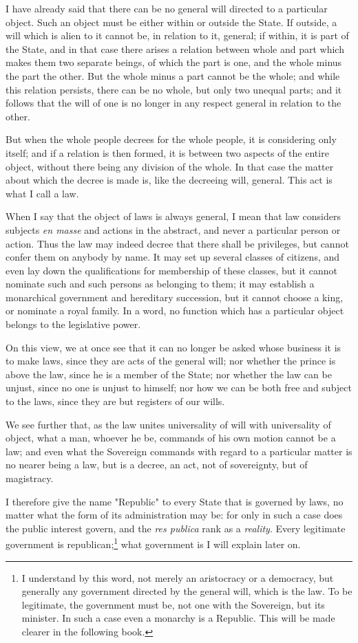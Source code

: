 \documentclass[12pt]{book}
\begin{document}
I have already said that there can be no general will directed to a particular object. Such an object must be either within or outside the State. If outside, a will which is alien to it cannot be, in relation to it, general; if within, it is part of the State, and in that case there arises a relation between whole and part which makes them two separate beings, of which the part is one, and the whole minus the part the other. But the whole minus a part cannot be the whole; and while this relation persists, there can be no whole, but only two unequal parts; and it follows that the will of one is no longer in any respect general in relation to the other.

But when the whole people decrees for the whole people, it is considering only itself; and if a relation is then formed, it is between two aspects of the entire object, without there being any division of the whole. In that case the matter about which the decree is made is, like the decreeing will, general. This act is what I call a law.

When I say that the object of laws is always general, I mean that law considers subjects \textit{en masse} and actions in the abstract, and never a particular person or action. Thus the law may indeed decree that there shall be privileges, but cannot confer them on anybody by name. It may set up several classes of citizens, and even lay down the qualifications for membership of these classes, but it cannot nominate such and such persons as belonging to them; it may establish a monarchical government and hereditary succession, but it cannot choose a king, or nominate a royal family. In a word, no function which has a particular object belongs to the legislative power.

On this view, we at once see that it can no longer be asked whose business it is to make laws, since they are acts of the general will; nor whether the prince is above the law, since he is a member of the State; nor whether the law can be unjust, since no one is unjust to himself; nor how we can be both free and subject to the laws, since they are but registers of our wills.

We see further that, as the law unites universality of will with universality of object, what a man, whoever he be, commands of his own motion cannot be a law; and even what the Sovereign commands with regard to a particular matter is no nearer being a law, but is a decree, an act, not of sovereignty, but of magistracy.

I therefore give the name "Republic" to every State that is governed by laws, no matter what the form of its administration may be: for only in such a case does the public interest govern, and the \textit{res publica} rank as a \textit{reality}. Every legitimate government is republican;\footnote{I understand by this word, not merely an aristocracy or a democracy, but generally any government directed by the general will, which is the law. To be legitimate, the government must be, not one with the Sovereign, but its minister. In such a case even a monarchy is a Republic. This will be made clearer in the following book.} what government is I will explain later on.
\end{document}
